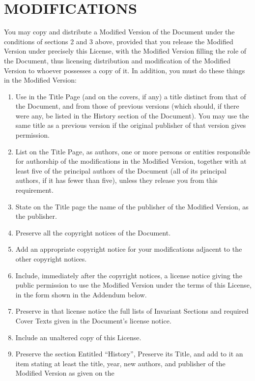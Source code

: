 \section{MODIFICATIONS}
You may copy and distribute a Modified Version of the Document under the conditions of
sections 2 and 3 above, provided that you release the Modified Version under precisely this
License, with the Modified Version filling the role of the Document, thus licensing distribution
and modification of the Modified Version to whoever possesses a copy of it. In addition, you
must do these things in the Modified Version:
\begingroup
\makeatletter
\def\theenumi{\@Alph\c@enumi}%
\makeatother
\begin{enumerate}
 \item Use in the Title Page (and on the covers, if any) a title distinct from that of the Document,
       and from those of previous versions (which should, if there were any, be listed in the
       History section of the Document). You may use the same title as a previous version if the
       original publisher of that version gives permission.
 \item List on the Title Page, as authors, one or more persons or entities responsible for
       authorship of the modifications in the Modified Version, together with at least five of the
       principal authors of the Document (all of its principal authors, if it has fewer than five),
       unless they release you from this requirement.
 \item State on the Title page the name of the publisher of the Modified Version, as the publisher.
 \item Preserve all the copyright notices of the Document.
 \item Add an appropriate copyright notice for your modifications adjacent to the other copyright
       notices.
 \item Include, immediately after the copyright notices, a license notice giving the public
       permission to use the Modified Version under the terms of this License, in the form shown
       in the Addendum below.
 \item Preserve in that license notice the full lists of Invariant Sections and required Cover Texts
       given in the Document’s license notice.
 \item Include an unaltered copy of this License.
 \item Preserve the section Entitled ``History'', Preserve its Title, and add to it an item stating
       at least the title, year, new authors, and publisher of the Modified Version as given on the

\end{enumerate}
